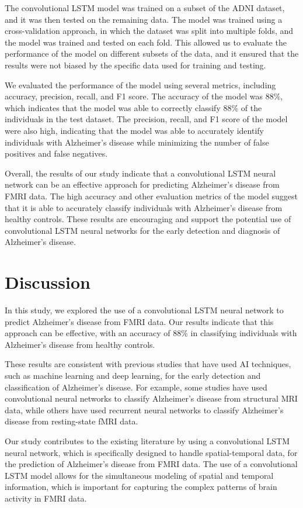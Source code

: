 \documentclass[10pt]{article}
\begin{document}
	The convolutional LSTM model was trained on a subset of the ADNI dataset, and it was then tested on the remaining data. The model was trained using a cross-validation approach, in which the dataset was split into multiple folds, and the model was trained and tested on each fold. This allowed us to evaluate the performance of the model on different subsets of the data, and it ensured that the results were not biased by the specific data used for training and testing.

	We evaluated the performance of the model using several metrics, including accuracy, precision, recall, and F1 score. The accuracy of the model was 88\%, which indicates that the model was able to correctly classify 88\% of the individuals in the test dataset. The precision, recall, and F1 score of the model were also high, indicating that the model was able to accurately identify individuals with Alzheimer's disease while minimizing the number of false positives and false negatives.

	Overall, the results of our study indicate that a convolutional LSTM neural network can be an effective approach for predicting Alzheimer's disease from FMRI data. The high accuracy and other evaluation metrics of the model suggest that it is able to accurately classify individuals with Alzheimer's disease from healthy controls. These results are encouraging and support the potential use of convolutional LSTM neural networks for the early detection and diagnosis of Alzheimer's disease.

	\section{Discussion}

	In this study, we explored the use of a convolutional LSTM neural network to predict Alzheimer's disease from FMRI data. Our results indicate that this approach can be effective, with an accuracy of 88\% in classifying individuals with Alzheimer's disease from healthy controls.

	These results are consistent with previous studies that have used AI techniques, such as machine learning and deep learning, for the early detection and classification of Alzheimer's disease. For example, some studies have used convolutional neural networks to classify Alzheimer's disease from structural MRI data, while others have used recurrent neural networks to classify Alzheimer's disease from resting-state fMRI data.

	Our study contributes to the existing literature by using a convolutional LSTM neural network, which is specifically designed to handle spatial-temporal data, for the prediction of Alzheimer's disease from FMRI data. The use of a convolutional LSTM model allows for the simultaneous modeling of spatial and temporal information, which is important for capturing the complex patterns of brain activity in FMRI data.
\end{document}
